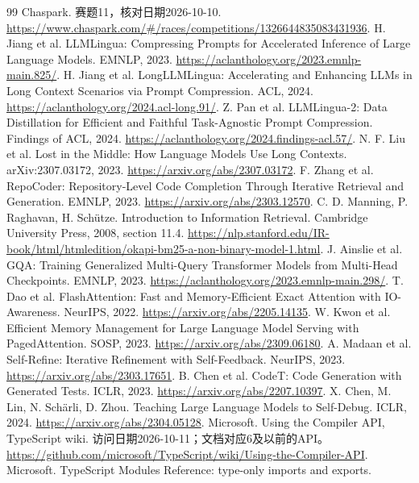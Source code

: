 \documentclass[UTF8,a4paper,11pt,fontset=fandol]{ctexart}
\begin{document}
\begin{thebibliography}{99}
 Chaspark. 赛题11，核对日期2026-10-10.
\url{https://www.chaspark.com/#/races/competitions/1326644835083431936}.
 H. Jiang et al. LLMLingua: Compressing Prompts for Accelerated Inference of Large Language Models. EMNLP, 2023.
\url{https://aclanthology.org/2023.emnlp-main.825/}.
 H. Jiang et al. LongLLMLingua: Accelerating and Enhancing LLMs in Long Context Scenarios via Prompt Compression. ACL, 2024.
\url{https://aclanthology.org/2024.acl-long.91/}.
 Z. Pan et al. LLMLingua-2: Data Distillation for Efficient and Faithful Task-Agnostic Prompt Compression. Findings of ACL, 2024.
\url{https://aclanthology.org/2024.findings-acl.57/}.
 N. F. Liu et al. Lost in the Middle: How Language Models Use Long Contexts. arXiv:2307.03172, 2023.
\url{https://arxiv.org/abs/2307.03172}.
 F. Zhang et al. RepoCoder: Repository-Level Code Completion Through Iterative Retrieval and Generation. EMNLP, 2023.
\url{https://arxiv.org/abs/2303.12570}.
 C. D. Manning, P. Raghavan, H. Sch\"utze. Introduction to Information Retrieval. Cambridge University Press, 2008, section 11.4.
\url{https://nlp.stanford.edu/IR-book/html/htmledition/okapi-bm25-a-non-binary-model-1.html}.
 J. Ainslie et al. GQA: Training Generalized Multi-Query Transformer Models from Multi-Head Checkpoints. EMNLP, 2023.
\url{https://aclanthology.org/2023.emnlp-main.298/}.
 T. Dao et al. FlashAttention: Fast and Memory-Efficient Exact Attention with IO-Awareness. NeurIPS, 2022.
\url{https://arxiv.org/abs/2205.14135}.
 W. Kwon et al. Efficient Memory Management for Large Language Model Serving with PagedAttention. SOSP, 2023.
\url{https://arxiv.org/abs/2309.06180}.
 A. Madaan et al. Self-Refine: Iterative Refinement with Self-Feedback. NeurIPS, 2023.
\url{https://arxiv.org/abs/2303.17651}.
 B. Chen et al. CodeT: Code Generation with Generated Tests. ICLR, 2023.
\url{https://arxiv.org/abs/2207.10397}.
 X. Chen, M. Lin, N. Sch\"arli, D. Zhou. Teaching Large Language Models to Self-Debug. ICLR, 2024.
\url{https://arxiv.org/abs/2304.05128}.
 Microsoft. Using the Compiler API, TypeScript wiki. 访问日期2026-10-11；文档对应6及以前的API。
\url{https://github.com/microsoft/TypeScript/wiki/Using-the-Compiler-API}.
 Microsoft. TypeScript Modules Reference: type-only imports and exports.

\end{thebibliography}
\end{document}
